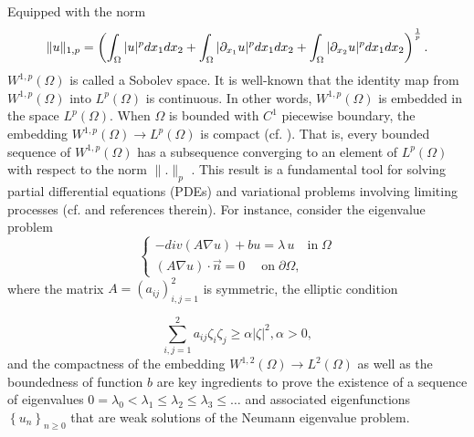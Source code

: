 \documentclass[11pt]{article}
\begin{document}
	Equipped with the norm 
	\begin{equation}
		\|u\|_{1,p}=\left(\int_{\Omega}|u|^pdx_1dx_2+\int_{\Omega} |\partial_{x_1} u|^p dx_1dx_2+\int_{\Omega} |\partial_{x_2} u|^p dx_1dx_2\right)^{1\over p}.
	\end{equation}
	$W^{1,p}\left(\Omega\right)$ is called a Sobolev space. It is well-known that the identity map from $W^{1,p}\left(\Omega\right)$ into $L^p\left(\Omega\right)$ is continuous. In other words, $W^{1,p}\left(\Omega\right)$ is embedded in the space $L^p\left(\Omega\right)$. When $\Omega$ is bounded with $C^1$ piecewise boundary, the embedding $W^{1,p}\left(\Omega\right)\rightarrow L^p(\Omega)$ is compact (cf. \cite[§5.7]{HB2011}). That is, every bounded sequence of $W^{1,p}\left(\Omega\right)$ has a subsequence converging to an element of $L^p\left(\Omega\right)$ with respect to the norm $\|.\|_{p}$ . This result is a fundamental tool for solving partial differential equations (PDEs) and variational problems involving limiting processes (cf. \cite{Evans, McOwen} and references therein). {For instance, consider the eigenvalue problem \cite{McOwen}
    \begin{equation}
		\left\{\begin{array}{ccc}
				-div(A\nabla u)+bu=\lambda\,u \quad \text{in} \; \Omega \label{seq1}\\
				\left(A\nabla u\right)\cdot\overrightarrow{n}=0 \quad \;\text{on} \; \partial \Omega,
			\end{array}\right.
		\end{equation}}
        where the matrix $A=\left(a_{ij}\right)_{i,j=1}^2$ is symmetric, the elliptic condition 

		\begin{equation}\label{ellc}
			\sum_{i,j=1}^{2}a_{ij}\zeta_i\zeta_j\geq \alpha |\zeta|^2,\alpha>0,
		\end{equation}
		 and the compactness of the embedding $W^{1,2}(\Omega)\rightarrow L^2(\Omega)$ {as well as} the boundedness of  function $b$ are key ingredients to prove the existence of a sequence of eigenvalues $0=\lambda_0<\lambda_1\leq \lambda_2\leq \lambda_3\leq \dots$ and associated eigenfunctions $\left\{u_n\right\}_{n\geq 0}$ that are weak solutions of the Neumann eigenvalue problem.
		
\end{document}

